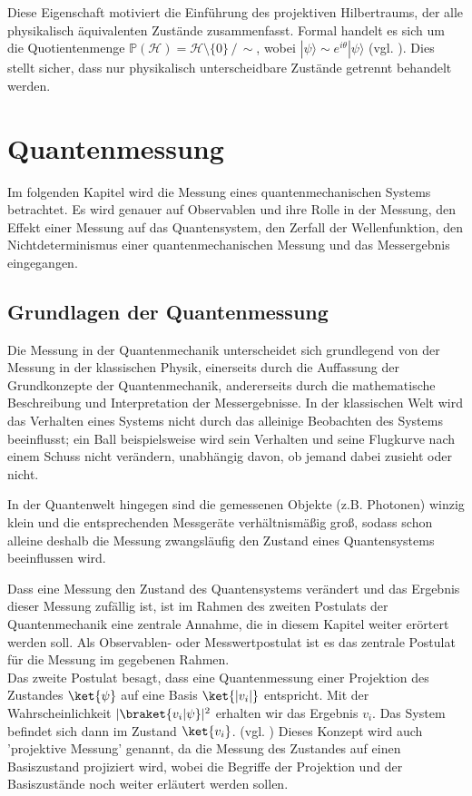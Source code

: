 Diese Eigenschaft motiviert die Einführung des projektiven Hilbertraums, der alle physikalisch äquivalenten Zustände zusammenfasst. Formal handelt es sich um die Quotientenmenge $\mathbb{P}(\mathcal{H}) = \mathcal{H} \setminus \{0\} \,/\, \sim$, wobei $|\psi\rangle \sim e^{i\theta}|\psi\rangle$ (vgl. \cite[Kap 2.1]{nielsen_quantum_2010}). Dies stellt sicher, dass nur physikalisch unterscheidbare Zustände getrennt behandelt werden.


\section{Quantenmessung }
\label{sec: Quantenmessung}
Im folgenden Kapitel wird die Messung eines quantenmechanischen Systems betrachtet. Es wird genauer auf Observablen und ihre Rolle in der Messung, den Effekt einer Messung auf das Quantensystem, den Zerfall der Wellenfunktion, den Nichtdeterminismus einer quantenmechanischen Messung und das Messergebnis eingegangen. 
\subsection{Grundlagen der Quantenmessung}
\label{subsec: Grundlagen der Quantenmessung}
Die Messung in der Quantenmechanik unterscheidet sich grundlegend von der Messung in der klassischen Physik, einerseits durch die Auffassung der Grundkonzepte der Quantenmechanik, andererseits durch die mathematische Beschreibung und Interpretation der Messergebnisse.
In der klassischen Welt wird das Verhalten eines Systems nicht durch das alleinige Beobachten des Systems beeinflusst; ein Ball beispielsweise wird sein Verhalten und seine Flugkurve nach einem Schuss nicht verändern, unabhängig davon, ob jemand dabei zusieht oder nicht. 

In der Quantenwelt hingegen sind die gemessenen Objekte (z.B. Photonen) winzig klein und die entsprechenden Messgeräte verhältnismäßig groß, sodass schon alleine deshalb die Messung zwangsläufig den Zustand eines Quantensystems beeinflussen wird. 

Dass eine Messung den Zustand des Quantensystems verändert und das Ergebnis dieser Messung zufällig ist, ist im Rahmen des zweiten Postulats der Quantenmechanik eine zentrale Annahme, die in diesem Kapitel weiter erörtert werden soll. Als Observablen- oder Messwertpostulat ist es das zentrale Postulat für die Messung im gegebenen Rahmen. 
\\

Das zweite Postulat besagt, dass eine Quantenmessung einer Projektion des Zustandes $\ket{\psi}$ auf eine Basis $\ket{|v_i|}$ entspricht. Mit der Wahrscheinlichkeit $|\braket{v_i|\psi}|^2$ erhalten wir das Ergebnis $v_i$. Das System befindet sich dann im Zustand $\ket{v_i}$. 
(vgl. \cite[Ch. 1.4.1]{lvovsky_quantum_2018}) 
\newline Dieses Konzept wird auch 'projektive Messung' genannt, da die Messung des Zustandes auf einen Basiszustand projiziert wird, wobei die Begriffe der Projektion und der Basiszustände noch weiter erläutert werden sollen. 
\\

